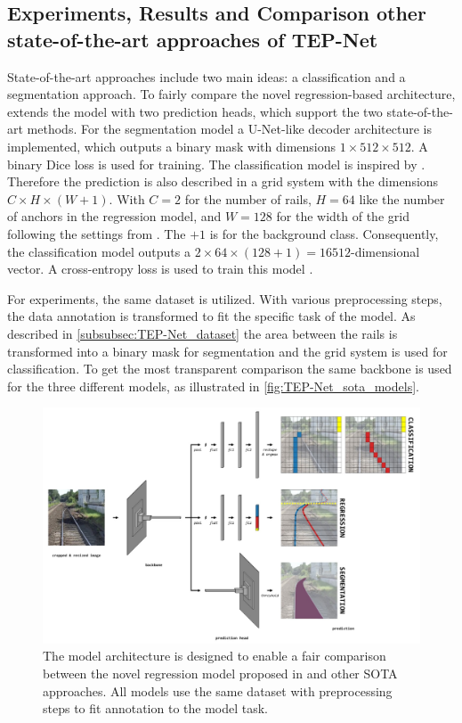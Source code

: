 \clearpage
\subsection{Experiments, Results and Comparison other state-of-the-art approaches of TEP-Net}

State-of-the-art approaches include two main ideas: a classification and a segmentation approach.
To fairly compare the novel regression-based architecture, \cite{tepNet2024} extends the model with two prediction heads, which support the two state-of-the-art methods.
For the segmentation model a U-Net-like \cite{uNet2015} decoder architecture is implemented, which outputs a binary mask with dimensions $1 \times 512 \times 512$.
A binary Dice loss is used for training.
The classification model is inspired by \cite{li2022rail}.
Therefore the prediction is also described in a grid system with the dimensions $C \times H \times (W + 1)$.
With $C=2$ for the number of rails, $H=64$ like the number of anchors in the regression model, and $W=128$ for the width of the grid following the settings from \cite{li2022rail}.
The $+1$ is for the background class.
Consequently, the classification model outputs a $2 \times 64 \times (128 + 1) = 16512$-dimensional vector.
A cross-entropy loss is used to train this model \cite{tepNet2024}.

For experiments, the same dataset is utilized.
With various preprocessing steps, the data annotation is transformed to fit the specific task of the model.
As described in \autoref{subsubsec:TEP-Net_dataset} the area between the rails is transformed into a binary mask for segmentation and the grid system is used for classification.
To get the most transparent comparison the same backbone is used for the three different models, as illustrated in \autoref{fig:TEP-Net_sota_models}.

\begin{figure}[H]
    \centering
    \includegraphics[width=\linewidth]{PICs/Baselinepaper/tep-net_sota_models.jpg}
    \caption{The model architecture is designed to enable a fair comparison between the novel regression model proposed in \cite{tepNet2024} and other \ac{SOTA} approaches.
    All models use the same dataset with preprocessing steps to fit annotation to the model task.}
    \label{fig:TEP-Net_sota_models}
\end{figure}

